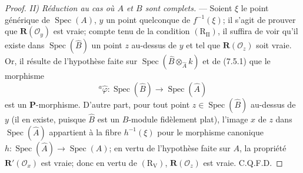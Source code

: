 \begin{proof}
\emph{II) Réduction au cas où $A$ et $B$ sont complets.} --- Soient $\xi$
le point générique de $\operatorname{Spec}(A)$, $y$ un point quelconque de
$f^{-1}(\xi)$; il s'agit de prouver que
$\boldsymbol R(\mathscr O_y)$ est vraie; compte tenu de la condition
$(\mathrm R_{\mathrm{II}})$, il suffira de voir qu'il existe dans
$\operatorname{Spec}(\widehat B)$ un point $z$ au-dessus de $y$ et tel que
$\boldsymbol R(\mathscr O_z)$ soit vraie. Or, il résulte de l'hypothèse
faite sur $\operatorname{Spec}(\widehat B\otimes_{\widehat A}k)$ et de
(7.5.1) que le morphisme
\enlargethispage{5\baselineskip}
\[
{}^a\widehat\varphi:\operatorname{Spec}(\widehat B)
\to\operatorname{Spec}(\widehat A)
\]
est un $\boldsymbol P$-morphisme. D'autre part, pour tout point
$z\in\operatorname{Spec}(\widehat B)$ au-dessus de $y$ (il en existe,
puisque $\widehat B$ est un $B$-module fidèlement plat), l'image $x$ de $z$
dans $\operatorname{Spec}(\widehat A)$ appartient à la fibre
$h^{-1}(\xi)$ pour le morphisme canonique
$h:\operatorname{Spec}(\widehat A)\to\operatorname{Spec}(A)$; en vertu de
l'hypothèse faite sur $A$, la propriété
$\boldsymbol R'(\mathscr O_x)$ est vraie; donc en vertu de
$(\mathrm R_{\mathrm V})$, $\boldsymbol R(\mathscr O_z)$ est vraie.
C.Q.F.D.
\end{proof}

